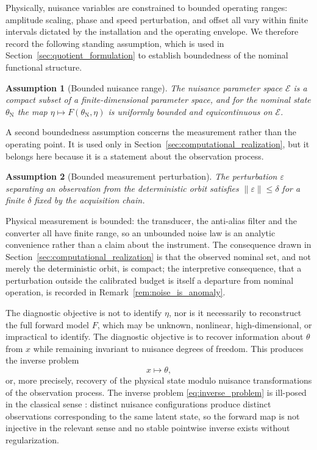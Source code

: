 \documentclass[a4paper]{cas-sc}
\newtheorem{assumption}{Assumption}
\newcommand{\EtaSpace}{\ensuremath{\mathcal{E}}}
\begin{document}
Physically, nuisance variables are constrained to bounded operating ranges:
amplitude scaling, phase and speed perturbation, and offset all vary within
finite intervals dictated by the installation and the operating envelope.
We therefore record the following standing assumption, which is used in
Section~\ref{sec:quotient_formulation} to establish boundedness of the
nominal functional structure.

\begin{assumption}[Bounded nuisance range]
\label{ass:compact_eta}
The nuisance parameter space \(\EtaSpace\) is a compact subset of a
finite-dimensional parameter space, and for the nominal state
\(\theta_{\mathrm{N}}\) the map \(\eta \mapsto F(\theta_{\mathrm{N}},\eta)\)
is uniformly bounded and equicontinuous on \(\EtaSpace\).
\end{assumption}

A second boundedness assumption concerns the measurement rather than the
operating point. It is used only in
Section~\ref{sec:computational_realization}, but it belongs here because it is
a statement about the observation process.

\begin{assumption}[Bounded measurement perturbation]
\label{ass:bounded_noise}
The perturbation \(\varepsilon\) separating an observation from the
deterministic orbit satisfies \(\lVert\varepsilon\rVert\le\delta\) for a
finite \(\delta\) fixed by the acquisition chain.
\end{assumption}

Physical measurement is bounded: the transducer, the anti-alias filter and the
converter all have finite range, so an unbounded noise law is an analytic
convenience rather than a claim about the instrument. The consequence drawn in
Section~\ref{sec:computational_realization} is that the observed nominal set,
and not merely the deterministic orbit, is compact; the interpretive
consequence, that a perturbation outside the calibrated budget is itself a
departure from nominal operation, is recorded in
Remark~\ref{rem:noise_is_anomaly}.

The diagnostic objective is not to identify \(\eta\), nor is it necessarily
to reconstruct the full forward model \(F\), which may be unknown,
nonlinear, high-dimensional, or impractical to identify. The diagnostic
objective is to recover information about \(\theta\) from \(x\) while
remaining invariant to nuisance degrees of freedom. This produces the
inverse problem
\begin{equation}
    x \longmapsto \theta,
    \label{eq:inverse_problem}
\end{equation}
or, more precisely, recovery of the physical state modulo nuisance
transformations of the observation process. The inverse problem
\eqref{eq:inverse_problem} is ill-posed in the classical sense
\citep{hadamard1932,tikhonov1977}: distinct nuisance configurations produce
distinct observations corresponding to the same latent state, so the forward
map is not injective in the relevant sense and no stable pointwise inverse
exists without regularization.
\end{document}

